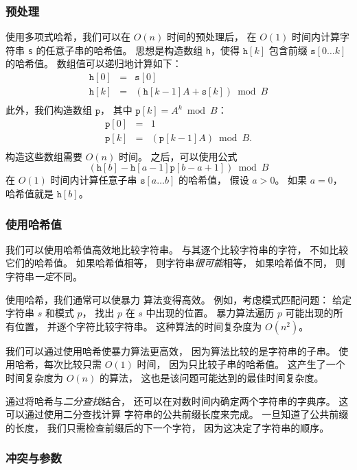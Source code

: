 \subsubsection*{预处理}

使用多项式哈希，我们可以在 $O(n)$ 时间的预处理后，
在 $O(1)$ 时间内计算字符串 \texttt{s} 的任意子串的哈希值。
思想是构造数组 \texttt{h}，使得
$\texttt{h}[k]$ 包含前缀 $\texttt{s}[0 \ldots k]$ 的哈希值。
数组值可以递归地计算如下：
\[
\begin{array}{lcl}
\texttt{h}[0] & = & \texttt{s}[0] \\
\texttt{h}[k] & = & (\texttt{h}[k-1] A + \texttt{s}[k]) \bmod B \\
\end{array}
\]
此外，我们构造数组 $\texttt{p}$，
其中 $\texttt{p}[k]=A^k \bmod B$：
\[
\begin{array}{lcl}
\texttt{p}[0] & = & 1 \\
\texttt{p}[k] & = & (\texttt{p}[k-1] A) \bmod B. \\
\end{array}
\]
构造这些数组需要 $O(n)$ 时间。
之后，可以使用公式
\[(\texttt{h}[b]-\texttt{h}[a-1] \texttt{p}[b-a+1]) \bmod B\]
在 $O(1)$ 时间内计算任意子串
$\texttt{s}[a \ldots b]$
的哈希值，
假设 $a>0$。
如果 $a=0$，哈希值就是 $\texttt{h}[b]$。

\subsubsection*{使用哈希值}

我们可以使用哈希值高效地比较字符串。
与其逐个比较字符串的字符，
不如比较它们的哈希值。
如果哈希值相等，
则字符串\emph{很可能}相等，
如果哈希值不同，
则字符串\emph{一定}不同。

使用哈希，我们通常可以使暴力
算法变得高效。
例如，考虑模式匹配问题：
给定字符串 $s$ 和模式 $p$，
找出 $p$ 在 $s$ 中出现的位置。
暴力算法遍历 $p$ 可能出现的所有位置，
并逐个字符比较字符串。
这种算法的时间复杂度为 $O(n^2)$。

我们可以通过使用哈希使暴力算法更高效，
因为算法比较的是字符串的子串。
使用哈希，每次比较只需 $O(1)$ 时间，
因为只比较子串的哈希值。
这产生了一个时间复杂度为 $O(n)$ 的算法，
这也是该问题可能达到的最佳时间复杂度。

通过将哈希与\emph{二分查找}结合，
还可以在对数时间内确定两个字符串的字典序。
这可以通过使用二分查找计算
字符串的公共前缀长度来完成。
一旦知道了公共前缀的长度，
我们只需检查前缀后的下一个字符，
因为这决定了字符串的顺序。

\subsubsection*{冲突与参数}


